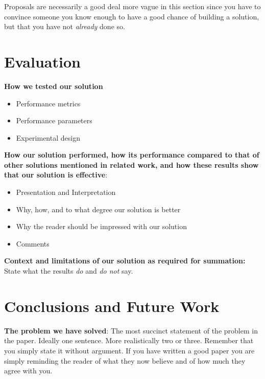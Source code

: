 \documentclass[pdf,bookmarks,colorlinks=true]{IEEEtran}
\begin{document}
Proposals are necessarily a good deal more vague in this section since
you have to convince someone you know enough to have a good chance of building
a solution, but that you have not {\em already} done so.



\section{Evaluation}
\label{sec:Evaluation}

\textbf{How we tested our solution}
\begin{itemize}
\item   Performance metrics
\item   Performance parameters
\item   Experimental design
\end{itemize}


\textbf{How our solution performed, how its performance compared to
that of other solutions mentioned in related work, and how these results show
that our solution is effective}:

\begin{itemize}
\item   Presentation and Interpretation
\item   Why, how, and to what degree our solution is better
\item   Why the reader should be impressed with our solution
\item   Comments

\end{itemize}


\textbf{Context and limitations of our solution as required for
summation:} State what the results {\em do} and {\em do not} say.



\section{Conclusions and Future Work}
\label{sec:Conclusion}

\textbf{The problem we have solved}: The most succinct statement of the problem in the paper. Ideally one
sentence. More realistically two or three. Remember that you simply state it
without argument. If you have written a good paper you are simply reminding the
reader of what they now believe and of how much they agree with you.
\end{document}
